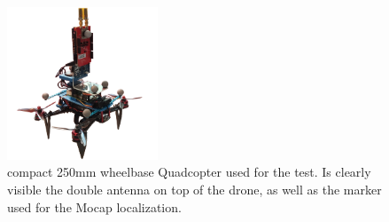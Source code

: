 \begin{figure}
    \centering
    \includegraphics[width=0.4\textwidth]{images/drone_reale_tagliato.png}
    \caption{compact 250mm wheelbase Quadcopter used for the test. Is clearly visible the double antenna on top of the drone, as well as the marker used for the Mocap localization.}
    \label{INT:fig:drone_photo}
\end{figure}


